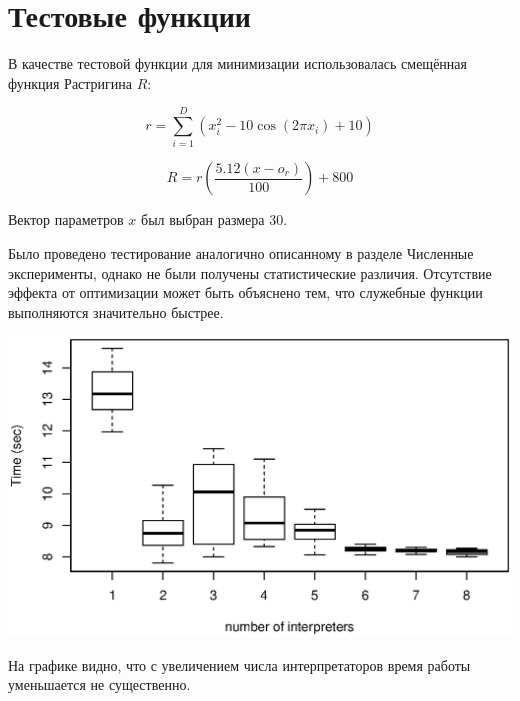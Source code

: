 \section*{Тестовые функции}

В качестве тестовой функции для минимизации
использовалась смещённая функция Растригина $R$:

\begin{equation*}
    r = \sum_{i = 1}^{D}(x_i^2 - 10\cos(2 \pi x_i) + 10)
\end{equation*}

\begin{equation*}
    R = r\left(\frac{5.12 (x - o_r)}{100}\right) + 800
\end{equation*}

Вектор параметров $x$ был выбран размера 30.

Было проведено тестирование
аналогично описанному в разделе
Численные эксперименты,
однако не были получены
статистические различия.
Отсутствие эффекта
от оптимизации может
быть объяснено тем,
что служебные функции
выполняются значительно быстрее.

\includegraphics{rastrigin}

На графике видно, что
с увеличением числа интерпретаторов
время работы уменьшается не существенно.

